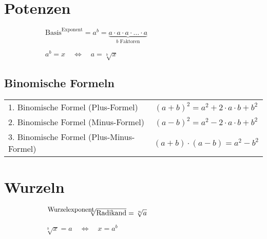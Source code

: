 \documentclass[11pt,a4paper,oneside]{article}
\newcommand{\sidebysideB}[2]{
\begin{figure}[H]
\begin{subfigure}[t]{0.5\linewidth}
#1
\end{subfigure}%
\begin{subfigure}[t]{0.5\linewidth}
#2
\end{subfigure}
\end{figure}
}
\begin{document}
\section{Potenzen}
\sidebysideB{
$\text{Basis}^{\text{Exponent}}=a^{b}=\underbrace{a\cdot a\cdot a\cdot\ldots\cdot a}_{b\text{ Faktoren}}$}{$a^{b}=x\quad\Leftrightarrow\quad a=\sqrt[b]{x}$}

\subsection{Binomische Formeln}
\vspace{-1em}
\begin{table}[H]
\begin{tabular}{@{}lc}
\rule{0pt}{1.5em}1. Binomische Formel (Plus-Formel) & $\left(a+b\right)^{2}=a^{2}+2\cdot a\cdot b+b^{2}$\\
\rule{0pt}{1.5em}2. Binomische Formel (Minus-Formel) & $\left(a-b\right)^{2}=a^{2}-2\cdot a\cdot b+b^{2}$\\
\rule{0pt}{1.5em}3. Binomische Formel (Plus-Minus-Formel) & $\left(a+b\right)\cdot\left(a-b\right)=a^{2}-b^{2}$\\
\end{tabular}
\end{table}

\section{Wurzeln}
\sidebysideB{\hspace{-2pt}$\sqrt[\text{\begin{small}Wurzelexponent\end{small}}]{\text{Radikand}}=\sqrt[n]{a}$}{$\sqrt[b]{x}=a\quad\Leftrightarrow\quad x=a^{b}$}
\end{document}

